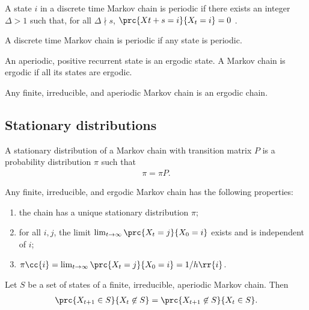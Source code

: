 \documentclass{article}
\begin{document}
\begin{definition}
  A state $i$ in a discrete time Markov chain is periodic if there exists an integer
  $\Delta>1$ such that, for all $\Delta\nmid s$, $\prc{X{t+s}=i}{X_t = i}=0$ .

  A discrete time Markov chain is periodic if any state is periodic.
\end{definition}

\begin{definition}
  An aperiodic, positive recurrent state is an ergodic state. A Markov chain is ergodic
  if all its states are ergodic.
\end{definition}

\begin{lemma}
  Any finite, irreducible, and aperiodic Markov chain is an ergodic chain.
\end{lemma}

\subsection{Stationary distributions}

\begin{definition}
  A stationary distribution of a Markov chain with transition matrix $P$ is
  a probability distribution $\pi$ such that
  \begin{align*}
    \pi = \pi P.
  \end{align*}
\end{definition}

\begin{theorem}
  Any finite, irreducible, and ergodic Markov chain has the following properties:
  \begin{enumerate}
    \item the chain has a unique stationary distribution $\pi$;
    \item for all $i,j$, the limit $\lim_{t\to\infty} \prc{X_t=j}{X_0=i}$
      exists and is independent of $i$;
    \item $\pi\cc{i}=\lim_{t\to\infty} \prc{X_t=j}{X_0=i}=1/h\rr{i}$.
  \end{enumerate}
\end{theorem}

\begin{theorem}
  Let $S$ be a set of states of a finite, irreducible, aperiodic Markov chain.
  Then
  \begin{align*}
    \prc{X_{t+1}\in S}{X_t\not\in S} = \prc{X_{t+1}\not\in S}{X_t\in S}.
  \end{align*}
\end{theorem}
\end{document}
